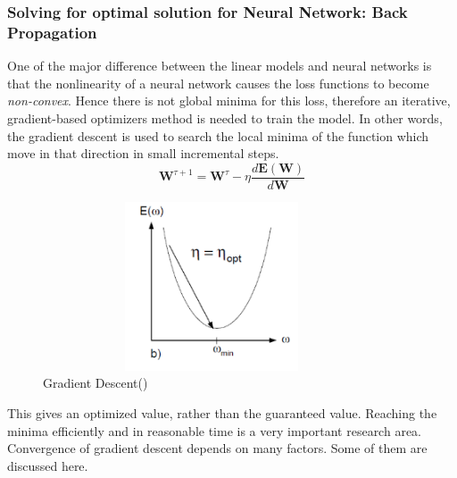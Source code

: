 \begin{enumerate}
	\subsubsection{Solving for optimal solution for Neural Network: Back Propagation}
	One of the major difference between the linear models and neural networks is that the nonlinearity of a neural network causes the loss functions to become \textit{non-convex}. Hence there is not global minima for this loss, therefore an iterative, gradient-based optimizers method is needed to train the model. In other words, the gradient descent is used to search the local minima of the function which move in that direction in small incremental steps.
	\begin{equation}
	\mathbf{W}^{\tau+1} = \mathbf{W}^\tau - \eta \dfrac{d\mathbf{E(W)}}{d\mathbf{W}}
	\end{equation}
	\begin{figure}[H]
		\centering
		\includegraphics[width=10cm,height=5cm,keepaspectratio]{files/grad.png}
		\caption{Gradient Descent(\cite{lecun2012efficient})}
		\label{fig:act}
	\end{figure}
	This gives an optimized value, rather than the guaranteed value. Reaching the minima efficiently and in reasonable time is a very important research area. Convergence of gradient descent depends on many factors. Some of them are discussed here.\\
	\begin{figure}[H]
		\centering

\end{figure}
\end{enumerate}
